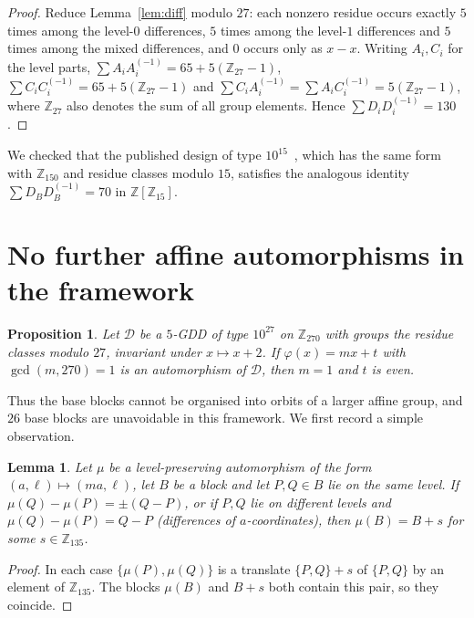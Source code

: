 \documentclass[11pt]{article}
\newtheorem{proposition}[theorem]{Proposition}
\newtheorem{lemma}[theorem]{Lemma}
\theoremstyle{remark}
\newcommand{\Z}{\mathbb{Z}}
\begin{document}
\begin{proof}
Reduce Lemma~\ref{lem:diff} modulo $27$: each nonzero residue occurs exactly $5$ times among the level-$0$
differences, $5$ times among the level-$1$ differences and $5$ times among the mixed differences, and $0$
occurs only as $x-x$.  Writing $A_i,C_i$ for the level parts,
$\sum A_iA_i^{(-1)}=65+5(\Z_{27}-1)$, $\sum C_iC_i^{(-1)}=65+5(\Z_{27}-1)$ and
$\sum C_iA_i^{(-1)}=\sum A_iC_i^{(-1)}=5(\Z_{27}-1)$, where $\Z_{27}$ also denotes the sum of all group
elements.  Hence $\sum D_iD_i^{(-1)}=130$.
\end{proof}

We checked that the published design of type $10^{15}$~\cite{Forbes2023}, which has the same form
with $\Z_{150}$ and residue classes modulo $15$, satisfies the analogous identity
$\sum D_BD_B^{(-1)}=70$ in $\Z[\Z_{15}]$.

\section{No further affine automorphisms in the framework}\label{sec:affine}

\begin{proposition}\label{prop:affine}
Let $\mathcal D$ be a $5$-GDD of type $10^{27}$ on $\Z_{270}$ with groups the residue classes modulo $27$,
invariant under $x\mapsto x+2$.  If $\varphi(x)=mx+t$ with $\gcd(m,270)=1$ is an automorphism of
$\mathcal D$, then $m=1$ and $t$ is even.
\end{proposition}

\noindent
Thus the base blocks cannot be organised into orbits of a larger affine group, and $26$ base blocks
are unavoidable in this framework.  We first record a simple observation.

\begin{lemma}\label{lem:transl}
Let $\mu$ be a level-preserving automorphism of the form $(a,\ell)\mapsto(ma,\ell)$, let $B$ be a block and
let $P,Q\in B$ lie on the same level.  If $\mu(Q)-\mu(P)=\pm(Q-P)$, or if $P,Q$ lie on different levels and
$\mu(Q)-\mu(P)=Q-P$ (differences of $a$-coordinates), then $\mu(B)=B+s$ for some $s\in\Z_{135}$.
\end{lemma}

\begin{proof}
In each case $\{\mu(P),\mu(Q)\}$ is a translate $\{P,Q\}+s$ of $\{P,Q\}$ by an element of
$\Z_{135}$.  The blocks $\mu(B)$ and $B+s$ both contain this pair, so they coincide.
\end{proof}
\end{document}
